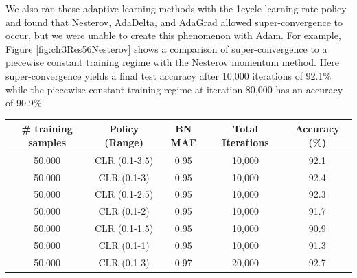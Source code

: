 \documentclass{article}
\begin{document}
	We also ran these adaptive learning methods with the 1cycle learning rate policy and found that  Nesterov, AdaDelta, and AdaGrad allowed super-convergence to occur, but we were unable to create this phenomenon with Adam.
	For example, Figure \ref{fig:clr3Res56Nesterov} shows a comparison of super-convergence to a piecewise constant training regime with the Nesterov momentum method.
	Here super-convergence yields a final test accuracy after 10,000 iterations of 92.1\% while the piecewise constant training regime at iteration 80,000 has an accuracy of 90.9\%.
	
	
	
	\begin{table}[tb]
		\begin{center}
			\begin{tabular}{| c | c | c | c | c | }
				\hline
				\# training samples & Policy (Range)  & BN MAF &  Total Iterations &Accuracy (\%) \\ \hline
				50,000 & CLR (0.1-3.5) & 0.95 & 10,000 & 92.1 \\ \hline
				50,000 & CLR (0.1-3)   & 0.95 & 10,000 & 92.4 \\ \hline
				50,000 & CLR (0.1-2.5) & 0.95 & 10,000 & 92.3 \\ \hline  
				50,000 & CLR (0.1-2)   & 0.95 & 10,000 & 91.7 \\ \hline
				50,000 & CLR (0.1-1.5) & 0.95 & 10,000 & 90.9 \\ \hline
				50,000 & CLR (0.1-1)   & 0.95 & 10,000 & 91.3 \\ \hline
				\hline
				50,000 & CLR (0.1-3)   & 0.97 & 20,000 & 92.7 \\ \hline

\end{tabular}
\end{center}
\end{table}
\end{document}
